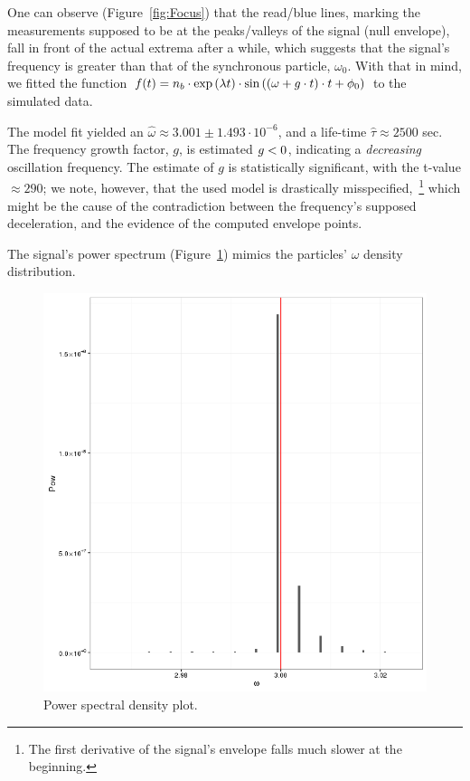 \documentclass{article}
\begin{document}
One can observe (Figure~\ref{fig:Focus}) that the read/blue lines, marking the measurements supposed to be at the peaks/valleys of the signal (null envelope), fall in front of the actual extrema after a while, which suggests that the signal's frequency is greater than that of the synchronous particle, $\omega_0$. With that in mind, we fitted the function $f(t) = n_b\cdot\exp\bkt{\lambda t}\cdot\sin\bkt{(\omega+\dwcoef\cdot t)\cdot t + \phi_0}$ to the simulated data.

The model fit yielded an $\hat{\omega} \approx 3.001 \pm 1.493\cdot10^{-6}$, and a life-time $\hat{\tau}\approx 2500$ sec. The frequency growth factor, $g$, is estimated $g < 0$, indicating a \emph{decreasing} oscillation frequency. The estimate of $g$ is statistically significant, with the t-value $\approx 290$; we note, however, that the used model is drastically misspecified,~\footnote{The first derivative of the signal's envelope falls much slower at the beginning.} which might be the cause of the contradiction between the frequency's supposed deceleration, and the evidence of the computed envelope points. 

The signal's power spectrum (Figure~\ref{fig:PSD_cDyPhys}) mimics the particles' $\omega$ density distribution.
\begin{figure}[h]
	\centering
	\includegraphics[scale=.5]{../img/Spec_PhysDistros}
	\caption{Power spectral density plot.\label{fig:PSD_cDyPhys}}
\end{figure}
\end{document}
